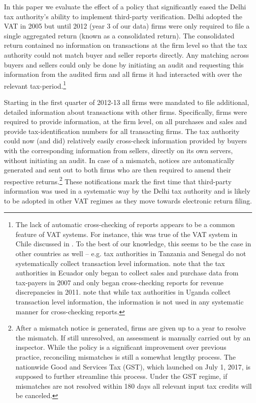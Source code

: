 In this paper we evaluate the effect of a policy that significantly eased the Delhi tax authority's ability to implement third-party verification. Delhi adopted the VAT in 2005 but until 2012 (year 3 of our data) firms were only required to file a single aggregated return (known as a consolidated return). The consolidated return contained no information on transactions at the firm level so that the tax authority could not match buyer and seller reports directly. Any matching across buyers and sellers could only be done by initiating an audit
and requesting this information from the audited firm and all firms it had interacted with over the relevant tax-period.\footnote{The lack of automatic cross-checking of reports appears to be a common feature of VAT systems. For instance, this was true of the VAT system in Chile discussed in \cite{pomeranz2015no}.  To the best of our knowledge, this seems to be the case in other countries as well -- e.g. tax authorities in Tanzania and Senegal do not systematically collect transaction level information. \cite{Carrilloetal:2017} note that the tax authorities in Ecuador only began to collect sales and purchase data from tax-payers in 2007 and only began cross-checking reports for revenue discrepancies in 2011. \citet{almunia2017analysis} note that while tax authorities in Uganda collect transaction level information, the information is not used in any systematic manner for cross-checking reports.}

Starting in the first quarter of 2012-13 all firms were mandated to file additional, detailed information about transactions with other firms. Specifically, firms were required to provide information, at the firm level, on all purchases and sales and provide tax-identification numbers for all transacting firms. The tax authority could now (and did) relatively easily cross-check information provided by buyers with the corresponding information from sellers, directly on its own servers, without initiating an audit. In case of a mismatch, notices are automatically generated and sent out to both firms who are then required to amend their respective returns.\footnote{After a mismatch notice is generated, firms are given up to a year to resolve the mismatch. If still unresolved, an assessment is manually carried out by an inspector. While the policy is a significant improvement over previous practice, reconciling mismatches is still a somewhat lengthy process. The nationwide Good and Services Tax (GST), which launched on July 1, 2017, is supposed to further streamline this process. Under the GST regime, if mismatches are not resolved within 180 days all relevant input tax credits will be canceled.}  These notifications mark the first time that third-party information was used in a systematic way by the Delhi tax authority and is likely to be adopted in other VAT regimes as they move towards electronic return filing.

